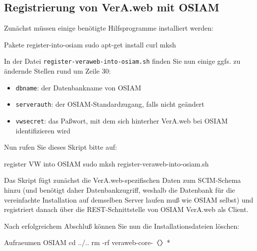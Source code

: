 \documentclass{tarentanleitung}
\newcommand{\vwiaverssw}{1.9.5}
\begin{document}
\subsection{Registrierung von VerA.web mit OSIAM}\label{subsec:setup-osiam-register}

\begin{minipage}{\linewidth}
Zunächst müssen einige benötigte Hilfsprogramme installiert werden:

\begin{lstdump}{Pakete register-into-osiam}
sudo apt-get install curl mksh
\end{lstdump}
\end{minipage}

In der Datei \texttt{register-veraweb-into-osiam.sh} finden
Sie nun einige ggfs. zu ändernde Stellen rund um Zeile 30:
\keinumbruch

\begin{itemize}
 \item{\texttt{dbname}: der Datenbankname von OSIAM}
 \item{\texttt{serverauth}: der OSIAM-Standardzugang,
  falls nicht geändert}
 \item{\texttt{vwsecret}: das Paßwort, mit dem sich
  hinterher VerA.web bei OSIAM identifizieren wird}
\end{itemize}

\begin{minipage}{\linewidth}
Nun rufen Sie dieses Skript bitte auf:

\begin{lstdump}{register VW into OSIAM}
sudo mksh register-veraweb-into-osiam.sh
\end{lstdump}
\end{minipage}

Das Skript fügt zunächst die VerA.web-spezifischen Daten
zum SCIM-Schema hinzu (und benötigt daher Datenbankzugriff,
weshalb die Datenbank für die vereinfachte Installation
auf demselben Server laufen muß wie OSIAM selbst) und
registriert danach über die REST-Schnittstelle von OSIAM
VerA.web als Client.

\begin{minipage}{\linewidth}
Nach erfolgreichem Abschluß können Sie nun die
Installationsdateien löschen:

\begin{lstdump}{Aufraeumen OSIAM}
cd ../..
rm -rf veraweb-core-〈\lstdumpesc{\vwiaverssw}〉*
\end{lstdump}
\end{minipage}
\end{document}

